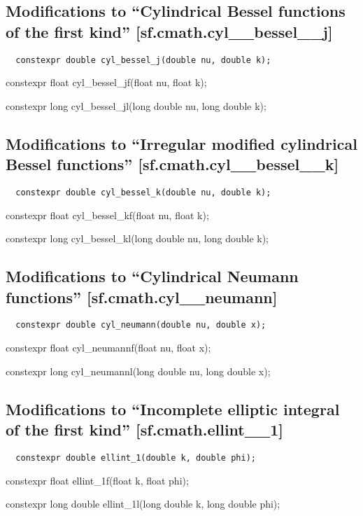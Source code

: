 \documentclass[prd,twocolumn,amsmath,amssymb,nofootinbib,eqsecnum]{revtex4-1}
\newcommand{\code}[1]{{\tt #1}}
\newcommand{\highlight}[1]{{\color{red} #1}}
\begin{document}
\subsection{Modifications to  ``Cylindrical Bessel functions of the first kind''  [sf.cmath.cyl\_\_bessel\_\_j]}

\code{
	\highlight{constexpr} double cyl\_bessel\_j(double nu, double k);
	
	\highlight{constexpr} float cyl\_bessel\_jf(float nu, float k);
	
	\highlight{constexpr} long cyl\_bessel\_jl(long double nu, long double k);

}

\subsection{Modifications to  ``Irregular modified cylindrical Bessel functions''  [sf.cmath.cyl\_\_bessel\_\_k]}

\code{
	\highlight{constexpr} double cyl\_bessel\_k(double nu, double k);
	
	\highlight{constexpr} float cyl\_bessel\_kf(float nu, float k);
	
	\highlight{constexpr} long cyl\_bessel\_kl(long double nu, long double k);

}


\subsection{Modifications to  ``Cylindrical Neumann functions''  [sf.cmath.cyl\_\_neumann]}

\code{
	\highlight{constexpr} double cyl\_neumann(double nu, double x);
	
	\highlight{constexpr} float cyl\_neumannf(float nu, float x);
	
	\highlight{constexpr} long cyl\_neumannl(long double nu, long double x);

}

\subsection{Modifications to  ``Incomplete elliptic integral of the first kind''  [sf.cmath.ellint\_\_1]}

\code{
	\highlight{constexpr} double ellint\_1(double k, double phi);
	
	\highlight{constexpr} float ellint\_1f(float k, float phi);
	
	\highlight{constexpr} long double ellint\_1l(long double k, long double phi);

}
\end{document}
